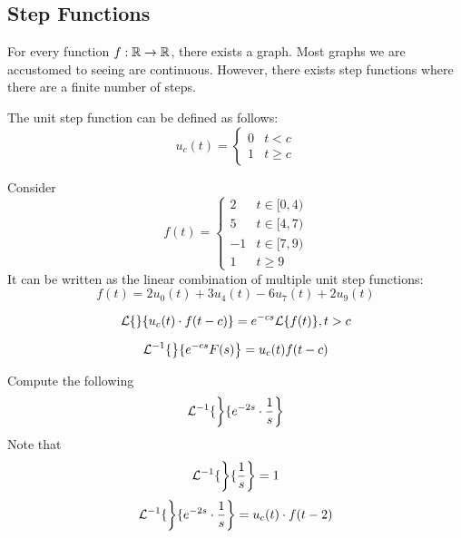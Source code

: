 \documentclass[diffeq.tex]{subfiles}
\begin{document}
    \subsection{Step Functions} %
    For every function $f: \mathbb{R} \to \mathbb{R}$, there exists a graph. Most graphs we are accustomed to seeing are continuous. However, there exists step functions where there are a finite number of steps.
    \np
    \begin{definition}
        The unit step function can be defined as follows:
        \begin{equation}
            u_{c}(t) = \begin{cases}
                0 & t < c\\
                1 & t \geq c
            \end{cases}
        \end{equation}
    \end{definition}
    \begin{example}
        Consider
        \begin{equation}
            f(t) = \begin{cases}
                2 & t \in [0, 4) \\
                5 & t \in [4, 7) \\
                -1 & t \in [7, 9) \\
                1 & t \geq 9
            \end{cases}
        \end{equation}
        It can be written as the linear combination of multiple unit step functions:
        \begin{equation}
            f(t) = 2u_{0}(t) + 3u_{4}(t) - 6u_{7}(t) + 2u_{9}(t)
        \end{equation}
    \end{example}
    \begin{btheorem}
        \begin{equation}
            \mathcal{L}\{\left\}\{u_{c}(t)\cdot f(t-c)\right\} = e^{-cs}\mathcal{L}\{f(t)\}, t > c
        \end{equation}
    \end{btheorem}
    \begin{corollary}
        \begin{equation}
            \mathcal{L}^{-1}\{\left\}\{e^{-cs}F(s)\right\} = u_{c}(t)f(t-c)
        \end{equation}
    \end{corollary}
    \begin{example}
        Compute the following
        \begin{equation}
            \mathcal{L}^{-1}\{\left\}\{e^{-2s}\cdot \frac{1}{s}\right\}
        \end{equation}
        Note that
        \begin{equation}
            \mathcal{L}^{-1}\{\left\}\{\frac{1}{s}\right\} = 1
        \end{equation}
        \begin{equation}
            \mathcal{L}^{-1}\{\left\}\{e^{-2s}\cdot \frac{1}{s}\right\} = u_{c}(t)\cdot f(t-2)
        \end{equation}
    \end{example}
\end{document}
